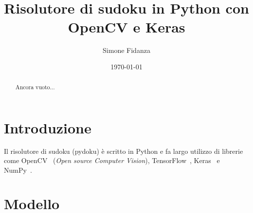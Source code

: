 \documentclass[a4paper, 10pt]{article}
\begin{document}
\title{Risolutore di sudoku in Python con OpenCV e Keras}
\author{Simone Fidanza}
\date{\today}


\maketitle

\begin{abstract}
    Ancora vuoto...
\end{abstract}


\section{Introduzione}\label{sec:introduzione}

Il risolutore di sudoku (pydoku) è scritto in Python e fa largo utilizzo di
librerie come OpenCV~\cite{opencv_library} (\emph{Open source Computer
Vision}), TensorFlow~\cite{tensorflow2015-whitepaper},
Keras~\cite{chollet2015keras} e NumPy~\cite{harris2020array}.





\section{Modello}

\medskip

\printbibliography
\end{document}
